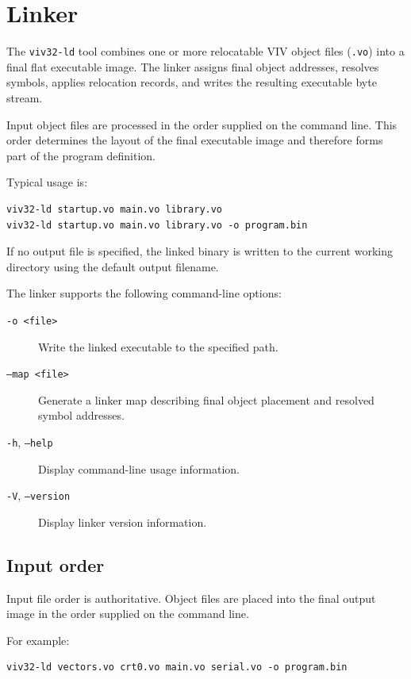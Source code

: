 \section{Linker}
\label{sec:toolchain-linker}

The \texttt{viv32-ld} tool combines one or more relocatable VIV object files
(\texttt{.vo}) into a final flat executable image. The linker assigns final object
addresses, resolves symbols, applies relocation records, and writes the
resulting executable byte stream.

Input object files are processed in the order supplied on the command line. This order
determines the layout of the final executable image and therefore forms part of the
program definition.

Typical usage is:

\begin{verbatim}
viv32-ld startup.vo main.vo library.vo
viv32-ld startup.vo main.vo library.vo -o program.bin
\end{verbatim}

If no output file is specified, the linked binary is written to the current working
directory using the default output filename.

The linker supports the following command-line options:

\begin{description}
    \item[\texttt{-o <file>}] Write the linked executable to the specified path.
    \item[\texttt{--map <file>}] Generate a linker map describing final object placement
    and resolved symbol addresses.
    \item[\texttt{-h}, \texttt{--help}] Display command-line usage information.
    \item[\texttt{-V}, \texttt{--version}] Display linker version information.
\end{description}

\subsection{Input order}

Input file order is authoritative. Object files are placed into the final output image
in the order supplied on the command line.

For example:

\begin{verbatim}
viv32-ld vectors.vo crt0.vo main.vo serial.vo -o program.bin
\end{verbatim}

